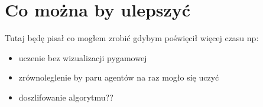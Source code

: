 \documentclass[a4paper, 12pt,oneside]{book}
\begin{document}
\section{Co można by ulepszyć}
Tutaj będę pisał co mogłem zrobić gdybym poświęcił więcej czasu np:
\begin{itemize}
\item uczenie bez wizualizacji pygamowej
\item zrównoleglenie by paru agentów na raz mogło się uczyć
\item doszlifowanie algorytmu??
\end{itemize}




\end{document}
